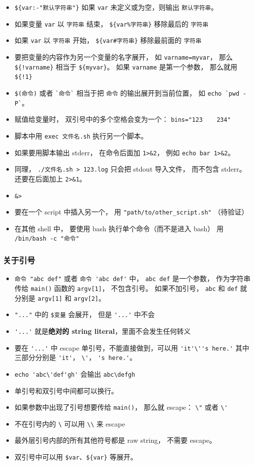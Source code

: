 \begin{itemize}
\item \verb`${var:-"默认字符串"}` 如果 \verb`var` 未定义或为空，则输出 \verb`默认字符串`。
\item 如果变量 \verb`var` 以 \verb`字符串` 结束， \verb`${var%字符串}` 移除最后的 \verb`字符串`
\item 如果 \verb`var` 以 \verb`字符串` 开始， \verb`${var#字符串}` 移除最前面的 \verb`字符串`
\item 要把变量的内容作为另一个变量的名字展开， 如 \verb`varname=myvar`， 那么 \verb`${!varname}` 相当于 \verb`${myvar}`。 如果 \verb`varname` 是第一个参数， 那么就用 \verb`${!1}`
\item \verb`$(命令)` 或者 \verb|`命令`| 相当于把 \verb`命令` 的输出展开到当前位置， 如 \verb|echo `pwd -P`|。
\item 赋值给变量时， 双引号中的多个空格会变为一个： \verb`bins="123    234"`
\item 脚本中用 \verb`exec 文件名.sh` 执行另一个脚本。
\item 如果要用脚本输出 stderr， 在命令后面加 \verb`1>&2`， 例如 \verb`echo bar 1>&2`。
\item 同理， \verb`./文件名.sh > 123.log` 只会把 stdout 导入文件， 而不包含 stderr。 还要在后面加上 \verb`2>&1`。
\item \verb`&>` 
\item 要在一个 script 中插入另一个， 用 \verb`"path/to/other_script.sh"` （待验证）
\item 在其他 shell 中， 要使用 bash 执行单个命令（而不是进入 bash） 用 \verb`/bin/bash -c "命令"`
\end{itemize}

\subsubsection{关于引号}
\begin{itemize}
\item \verb`命令 "abc def"` 或者 \verb`命令 'abc def'` 中， \verb`abc def` 是一个参数， 作为字符串传给 \verb`main()` 函数的 \verb`argv[1]`， 不包含引号。 如果不加引号， \verb`abc` 和 \verb`def` 就分别是 \verb`argv[1]` 和 \verb`argv[2]`。
\item \verb`"..."` 中的 \verb`$变量` 会展开， 但是 \verb`'...'` 中不会
\item \verb`'...'` 就是\textbf{绝对的 string literal}，里面不会发生任何转义
\item 要在 \verb`'...'` 中 escape 单引号，不能直接做到，可以用 \verb`'it'\''s here.'` 其中三部分分别是 \verb`'it'`， \verb`\'`， \verb`'s here.'`。
\item \verb`echo 'abc\'def'gh'` 会输出 \verb`abc\defgh`
\item 单引号和双引号中间都可以换行。
\item 如果参数中出现了引号想要传给 \verb`main()`， 那么就 escape： \verb`\"` 或者 \verb`\'`
\item 不在引号内的 \verb`\` 可以用 \verb`\\` 来 escape
\item 最外层引号内部的所有其他符号都是 raw string， 不需要 escape。
\item 双引号中可以用 \verb`$var`、\verb`${var}` 等展开。
\end{itemize}

